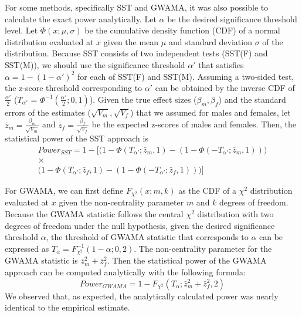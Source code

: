\documentclass[11pt]{article}
\begin{document}
For some methods, specifically SST and GWAMA, 
it was also possible to calculate the exact power analytically. 
Let $\alpha$ be the desired significance threshold level.
Let $\Phi(x; \mu, \sigma)$ be the cumulative density function (CDF) of 
a normal distribution evaluated at $x$ 
given the mean $\mu$ and standard deviation $\sigma$ of the distribution.
Because SST consists of two independent tests (SST(F) and SST(M)),
we should use the significance threshold $\alpha'$ that satisfies $\alpha=1-(1-\alpha')^2$ for each of SST(F) and SST(M).
Assuming a two-sided test, the z-score threshold corresponding to $\alpha'$ can be obtained by 
the inverse CDF of $\frac{\alpha'}{2}$
($T_{\alpha'}$ = $\Phi^{-1}(\frac{\alpha'}{2}; 0, 1)$).
Given the true effect sizes ($\beta_m, \beta_f$) and the standard errors of the estimates ($\sqrt{V_m}, \sqrt{V_f}$) that we assumed
for males and females, let $\bar{z}_m = \frac{\beta_m}{\sqrt{V_m}}$ and $\bar{z}_f = \frac{\beta_f}{\sqrt{V_f}}$ 
be the expected z-scores of males and females. %
Then, the statistical power of the SST approach is 
\begin{align*}
Power_{SST} = 1 - \bigg[ \Big(1 - \Phi( T_{\alpha'} ; \bar{z}_m, 1) - (1 - \Phi(-T_{\alpha'}; \bar{z}_m, 1   )   )  \Big) \\
                               \times  \\
                               \Big(1 - \Phi( T_{\alpha'}; \bar{z}_f, 1) - (1 - \Phi(-T_{\alpha'}; \bar{z}_f, 1   )   ) \Big) \bigg]
\end{align*}

For GWAMA, 
we can first define $F_{\chi^2}(x; m, k)$ as the CDF of a $\chi^2$ distribution evaluated at $x$ given the non-centrality parameter $m$
and $k$ degrees of freedom. 
Because the GWAMA statistic follows the central $\chi^2$ distribution with two degrees of
freedom under the null hypothesis, 
given the desired significance threshold $\alpha$, 
the threshold of GWAMA statistic that corresponds to $\alpha$ can be
expressed as $T_\alpha = F_{\chi^2}^{-1}(1-\alpha; 0, 2)$.
The non-centrality parameter for the GWAMA statistic is
$\bar{z}_m^2 + \bar{z}_f^2$.
Then the statistical power of the GWAMA approach can be computed analytically with the
following formula: 
\begin{equation}
Power_{GWAMA} = 1-F_{\chi^2}(T_{\alpha} ; \bar{z}_m^2 + \bar{z}_f^2, 2)
\label{power_gwama}
\end{equation}
We observed that, as expected, the analytically calculated power was nearly identical to the empirical estimate.
\end{document}
